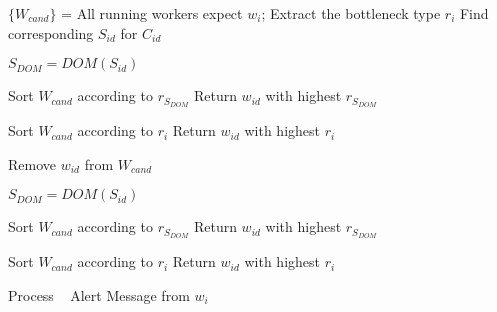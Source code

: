 \begin{algorithm}[ht]
\begin{algorithmic}[1]

\STATE $\{W_{cand}\}$ = All running workers expect $w_i$;
\STATE Extract the bottleneck type $r_i$
\STATE Find corresponding $S_{id}$ for $C_{id}$



  \STATE $S_{DOM} = DOM(S_{id})$


\STATE Sort $W_{cand}$ according to $r_{S_{DOM}}$
\STATE Return $w_{id}$ with highest $r_{S_{DOM}}$

\ELSE
\STATE Sort $W_{cand}$ according to $r_i$
\STATE Return $w_{id}$ with highest $r_i$

\ENDIF

  \ELSE
  \STATE Remove $w_{id}$ from $W_{cand}$
  \ENDIF
  \ENDFOR

  \STATE $S_{DOM} = DOM(S_{id})$


\STATE Sort $W_{cand}$ according to $r_{S_{DOM}}$
\STATE Return $w_{id}$ with highest $r_{S_{DOM}}$

\ELSE
\STATE Sort $W_{cand}$ according to $r_i$
\STATE Return $w_{id}$ with highest $r_i$

\ENDIF

\ENDIF



\end{algorithmic}
\caption{Process \sol~ Alert Message from $w_i$}
\label{alg:migrate}
\end{algorithm}
